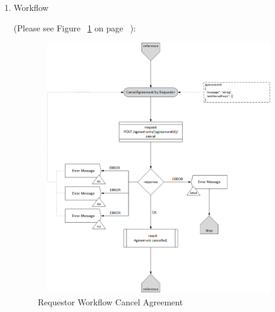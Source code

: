 \begin{enumerate}
\item Workflow

(Please see Figure ~\ref{fig:RCCA} on page ~\pageref{fig:RCCA}):

\begin{figure}[htbp]
    \centering
    \includegraphics[width=11cm,height=11cm,angle=0]{./diag/Workflow/Market/CancelAgreement-R-Workflow.png}
    \caption{Requestor Workflow Cancel Agreement  }
	\label{fig:RCCA}
\end{figure}

\end{enumerate}

\newpage



